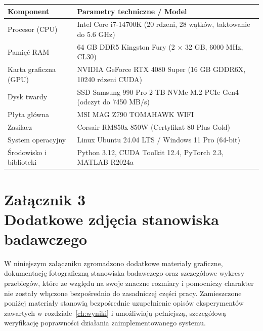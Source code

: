 \documentclass[11pt, a4paper, twoside]{report}
\begin{document}
\begin{table}[htbp]
	\centering 
	\label{tab:specyfikacja_komputera}
	\begin{tabular}{|l|p{9.5cm}|} 
		\hline %
		\textbf{Komponent} & \textbf{Parametry techniczne / Model} \\
		\hline %
		Procesor (CPU) & Intel Core i7-14700K (20 rdzeni, 28 wątków, taktowanie do 5.6 GHz) \\
		\hline
		Pamięć RAM & 64 GB DDR5 Kingston Fury (2 $\times$ 32 GB, 6000 MHz, CL30) \\
		\hline
		Karta graficzna (GPU) & NVIDIA GeForce RTX 4080 Super (16 GB GDDR6X, 10240 rdzeni CUDA) \\
		\hline
		Dysk twardy & SSD Samsung 990 Pro 2 TB NVMe M.2 PCIe Gen4 (odczyt do 7450 MB/s) \\
		\hline
		Płyta główna & MSI MAG Z790 TOMAHAWK WIFI \\
		\hline
		Zasilacz & Corsair RM850x 850W (Certyfikat 80 Plus Gold) \\
		\hline
		System operacyjny & Linux Ubuntu 24.04 LTS / Windows 11 Pro (64-bit) \\
		\hline
		Środowisko i biblioteki & Python 3.12, CUDA Toolkit 12.4, PyTorch 2.3, MATLAB R2024a \\
		\hline %
	\end{tabular}
\end{table}

\clearpage\thispagestyle{empty}\mbox{}\clearpage


\chapter*{Załącznik 3\\Dodatkowe zdjęcia stanowiska badawczego}
\label{zal:zdjecia} %

W niniejszym załączniku zgromadzono dodatkowe materiały graficzne, dokumentację fotograficzną stanowiska badawczego oraz szczegółowe wykresy przebiegów, które ze względu na swoje znaczne rozmiary i pomocniczy charakter nie zostały włączone bezpośrednio do zasadniczej części pracy. Zamieszczone poniżej materiały stanowią bezpośrednie uzupełnienie opisów eksperymentów zawartych w rozdziale~\ref{ch:wyniki} i umożliwiają pełniejszą, szczegółową weryfikację poprawności działania zaimplementowanego systemu.
\end{document}
